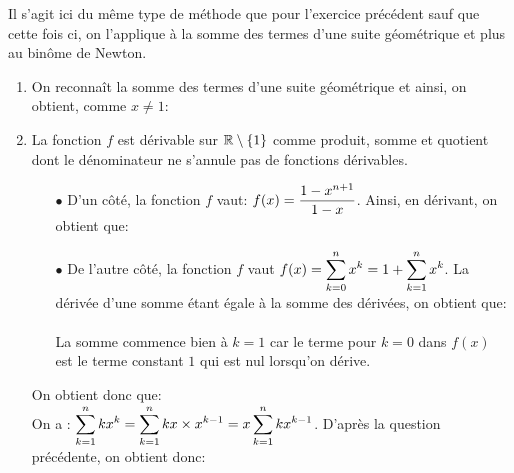 \documentclass[a4paper, 11pt,reqno]{article}
\begin{document}
\begin{correction}  \; Il s'agit ici du m\^{e}me type de m\'ethode que pour l'exercice pr\'ec\'edent sauf que cette fois ci, on l'applique \`{a} la somme des termes d'une suite g\'eom\'etrique et plus au bin\^{o}me de Newton.
\begin{enumerate}
\item On reconna\^{i}t la somme des termes d'une suite g\'eom\'etrique et ainsi, on obtient, comme $x\not= 1$:\\
\noindent  {}
\item La fonction $f$ est d\'erivable sur $\mathbb{R}\setminus\lbrace 1\rbrace$ comme produit, somme et quotient dont le d\'enominateur ne s'annule pas de fonctions d\'erivables. 
\begin{itemize}
\item[$\bullet$] D'un c\^{o}t\'e, la fonction $f$ vaut: $f(x)=\displaystyle\frac{1-x^{n+1}}{1-x}$. Ainsi, en d\'erivant, on obtient que:\\
\noindent {}
\item[$\bullet$] De l'autre c\^{o}t\'e, la fonction $f$ vaut $f(x)=\displaystyle \sum\limits_{k=0}^{n} x^k=1+\displaystyle \sum\limits_{k=1}^{n} x^k$. La d\'eriv\'ee d'une somme \'etant \'egale \`{a} la somme des d\'eriv\'ees, on obtient que:\\
\noindent {} \\
\noindent \warning La somme commence bien \`{a} $k=1$ car le terme pour $k=0$ dans $f(x)$ est le terme constant $1$ qui est nul lorsqu'on d\'erive.
\end{itemize} 
On obtient donc que: \\
On a : $\displaystyle \sum\limits_{k=1}^{n} k x^{k}=\displaystyle \sum\limits_{k=1}^{n} k x\times x^{k-1}=x\displaystyle \sum\limits_{k=1}^{n} k x^{k-1}$. D'apr\`{e}s la question pr\'ec\'edente, on obtient donc:\begin{center}
\end{center}

\end{enumerate}
\end{correction}
\end{document}
